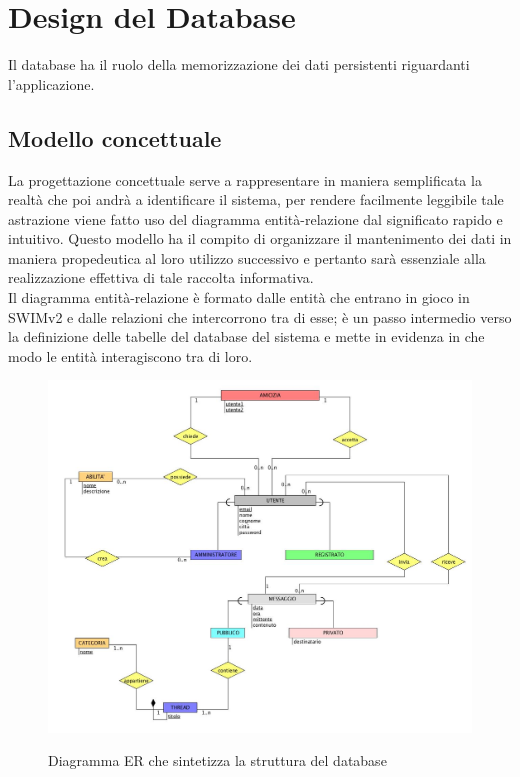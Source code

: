 \section{Design del Database}

Il database ha il ruolo della memorizzazione dei dati persistenti riguardanti l'applicazione.


\subsection{Modello concettuale}

La progettazione concettuale serve a rappresentare in maniera semplificata la realtà che poi andrà a identificare il sistema, per rendere facilmente leggibile tale astrazione viene fatto uso del diagramma    entità-relazione dal significato rapido e intuitivo. Questo modello ha il compito di organizzare il mantenimento dei dati in maniera propedeutica al loro utilizzo successivo e pertanto sarà essenziale alla realizzazione effettiva di tale raccolta informativa. 
\\[1\baselineskip]
Il diagramma entità-relazione è formato dalle entità che entrano in gioco in SWIMv2 e dalle relazioni che intercorrono tra di esse; è un passo intermedio
verso la definizione delle tabelle del database del sistema e mette in evidenza in che modo le entità interagiscono tra di loro.

\begin{figure} [!hbp]
\centering
\includegraphics[scale=0.35]{ER.jpg} \\
\caption{\label{entitaRelazioni} Diagramma ER che sintetizza la struttura del database}
\end{figure}

